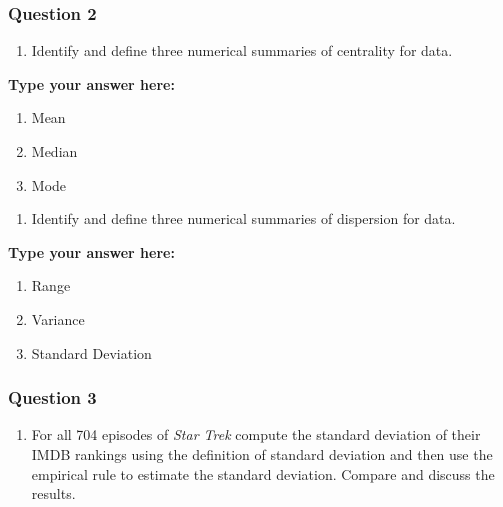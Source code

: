\documentclass[
]{article}
\providecommand{\tightlist}{%
  \setlength{\itemsep}{0pt}\setlength{\parskip}{0pt}}
\begin{document}
\hypertarget{question-2}{%
\subsubsection{Question 2}\label{question-2}}

\begin{enumerate}
\def\labelenumi{\alph{enumi}.}
\tightlist
\item
  Identify and define three numerical summaries of centrality for data.
\end{enumerate}

\textbf{Type your answer here:}

\begin{enumerate}
\def\labelenumi{\arabic{enumi}.}
\tightlist
\item
  Mean\\
\item
  Median
\item
  Mode
\end{enumerate}

\begin{enumerate}
\def\labelenumi{\alph{enumi}.}
\setcounter{enumi}{1}
\tightlist
\item
  Identify and define three numerical summaries of dispersion for data.
\end{enumerate}

\textbf{Type your answer here:}

\begin{enumerate}
\def\labelenumi{\arabic{enumi}.}
\tightlist
\item
  Range\\
\item
  Variance
\item
  Standard Deviation
\end{enumerate}

\hypertarget{question-3}{%
\subsubsection{Question 3}\label{question-3}}

\begin{enumerate}
\def\labelenumi{\alph{enumi}.}
\tightlist
\item
  For all 704 episodes of \emph{Star Trek} compute the standard
  deviation of their IMDB rankings using the definition of standard
  deviation and then use the empirical rule to estimate the standard
  deviation. Compare and discuss the results.
\end{enumerate}
\end{document}
